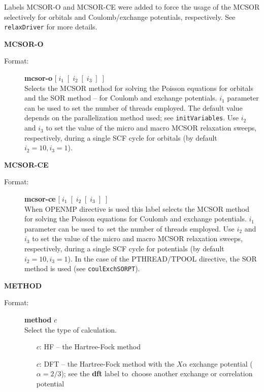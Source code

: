 \documentclass[10pt,a4paper]{article}
\newcommand{\ft}[1]{\texttt{#1}}
\newcommand{\fb}[1]{\textbf{#1}}
\begin{document}
\begin{description}
\begin{description}
  Labels MCSOR-O and MCSOR-CE were added to force the usage
  of the MCSOR selectively for orbitals and Coulomb/exchange potentials,
  respectively. See \ft{relaxDriver} for more details.
  
\end{description}

\item \textbf{MCSOR-O}
\begin{description}
\item[Format:] \textbf{mcsor-o} $[\;i_1\;[\;i_2\;[\;i_3\;]\;]$\\
  Selects the MCSOR method for solving the Poisson equations for orbitals
  and the SOR method -- for Coulomb and exchange potentials. $i_1$
  parameter can be used to set the number of threads employed. The default
  value depends on the parallelization method used; see
  \ft{initVariables}. Use $i_2$ and $i_3$ to set the value of the 
  micro and macro MCSOR relaxation sweeps, respectively, during a single SCF
  cycle for orbitals (by default  $i_2=10, i_3=1$).
\end{description}

\item \textbf{MCSOR-CE}
\begin{description}
\item[Format:] \textbf{mcsor-ce} $[\;i_1\;[\;i_2\;[\;i_3\;]\;]$\\
  When OPENMP directive is used this label selects the MCSOR method for
  solving the Poisson equations for Coulomb and exchange potentials.  $i_1$
  parameter can be used to~set the number of threads employed. Use $i_2$
  and $i_3$ to set the value of the micro and macro MCSOR relaxation
  sweeps, respectively, during a single SCF cycle for potentials (by
  default $i_2=10, i_3=1$). In the case of the PTHREAD/TPOOL directive, the SOR
  method is used (see \ft{coulExchSORPT}).
\end{description}

\item \textbf{METHOD}
\begin{description}
\item[Format:] \textbf{method} $c$\\
Select the type of calculation.
\begin{itemize}
\item[$c$:] HF -- the Hartree-Fock method
\item[$c$:] DFT -- the Hartree-Fock method with the $X\alpha$ exchange
  potential ($\alpha=2/3$); see the \fb{dft} label to~choose another
  exchange or correlation potential


\end{itemize}
\end{description}
\end{description}
\end{document}
